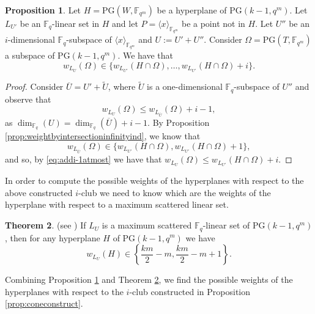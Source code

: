 \documentclass[11pt]{amsart}
\theoremstyle{definition}
\newtheorem{theorem}{Theorem}[section]
\newtheorem{proposition}[theorem]{Proposition}
\newcommand{\F}{{\mathbb F}}
\newcommand{\fq}{{\mathbb F}_{q}}
\newcommand{\PG}{\mathrm{PG}}
\newcommand{\fqm}{\mathbb{F}_{q^m}}
\begin{document}
\begin{proposition} \label{prop:weightbyintersectioninfinity}
Let $H=\PG(W,\fqm)$ be a hyperplane of $\mathrm{PG}(k-1,q^m)$. Let $L_{U'}$ be an $\fq$-linear set in $H$ and let $P =\langle x\rangle_{\mathbb{F}_{q^m}}$ be a point not in $H$.
Let $U''$ be an $i$-dimensional $\fq$-subspace of $\langle x\rangle_{\mathbb{F}_{q^m}}$ and  $U:=U'+U''$.
Consider $\Omega=\PG(T,\F_{q^m})$ a subspace of $\PG(k-1,q^m)$.
We have that
\[ w_{L_U}(\Omega) \in \{w_{L_{U'}}(H\cap \Omega),\ldots,w_{L_{U'}}(H\cap \Omega)+i\}. \]
\end{proposition}
\begin{proof}
    Consider $\overline{U}=U'+\tilde{U}$, where $\tilde{U}$ is a one-dimensional $\fq$-subspace of $U''$ and observe that
    \begin{equation}\label{eq:addi-1atmost}
        w_{L_U}(\Omega)\leq w_{L_{\overline{U}}}(\Omega)+i-1,
    \end{equation}
    as $\dim_{\fq}(U)=\dim_{\fq}(\overline{U})+i-1$.
    By Proposition \ref{prop:weightbyintersectioninfinityind}, we know that 
    \[w_{L_{\overline{U}}}(\Omega) \in \{w_{L_{U'}}(H\cap \Omega),w_{L_{U'}}(H\cap \Omega)+1\},\]
    and so, by \eqref{eq:addi-1atmost} we have that $w_{L_U}(\Omega) \leq w_{L_{U'}}(H\cap \Omega)+i$.
\end{proof}

In order to compute the possible weights of the hyperplanes with respect to the above constructed $i$-club we need to know which are the weights of the hyperplane with respect to a maximum scattered linear set.

\begin{theorem}{(see \cite[Theorem 4.2]{blokhuis2000scattered})}
 \label{th:inter}
If $L_U$ is a maximum scattered $\F_q$-linear set of PG$(k-1,q^m)$, then for any hyperplane $H$ of PG$(k-1,q^m)$ we have
\[
w_{L_{U}}(H) \in \left\{  \frac{km}{2}-m,  \frac{km}{2}-m+1\right\}.
\]
\end{theorem}

Combining Proposition \ref{prop:weightbyintersectioninfinity} and Theorem \ref{th:inter}, we find the possible weights of the hyperplanes with respect to the $i$-club constructed in Proposition \ref{prop:coneconstruct}.
\end{document}
